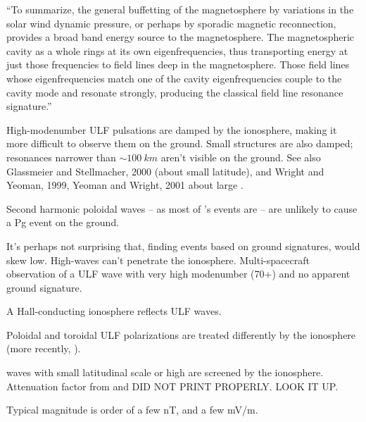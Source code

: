``To summarize, the general buffetting of the magnetosphere by variations in the solar wind dynamic pressure, or perhaps by sporadic magnetic reconnection, provides a broad band energy source to the magnetosphere. The magnetospheric cavity as a whole rings at its own eigenfrequencies, thus transporting energy at just those frequencies to field lines deep in the magnetosphere. Those field lines whose eigenfrequencies match one of the cavity eigenfrequencies couple to the cavity mode and resonate strongly, producing the classical field line resonance signature.\cite{hughes_1994}'' 


High-modenumber ULF pulsations are damped by the ionosphere, making it more difficult to observe them on the ground\cite{hughes_1976}. Small structures are also damped; resonances narrower than $\sim \SI{100}{km}$ aren't visible on the ground. See also Glassmeier and Stellmacher, 2000 (about small latitude), and Wright and Yeoman, 1999, Yeoman and Wright, 2001 about large \azm. 

Second harmonic poloidal waves -- as most of \cite{dai_2015}'s events are -- are unlikely to cause a Pg event on the ground\cite{takahashi_1992}. 

It's perhaps not surprising that, finding events based on ground signatures, \azm would skew low. High-\azm waves can't penetrate the ionosphere. Multi-spacecraft observation of a ULF wave with very high modenumber (70+) and no apparent ground signature\cite{takahashi_2013}. 


A Hall-conducting ionosphere reflects ULF waves\cite{hughes_1974}. 

Poloidal and toroidal ULF polarizations are treated differently by the ionosphere\cite{greifinger_1968} (more recently, \cite{fujita_1988}).  


\Alfven waves with small latitudinal scale\cite{glassmeier_2000} or high \azm\cite{wright_1999,yeoman_2001} are screened by the ionosphere. Attenuation factor from \cite{hughes_1976} and \cite{glassmeier_1984} DID NOT PRINT PROPERLY. LOOK IT UP. 

Typical magnitude is order of a few nT, and a few mV/m\cite{takahashi_2013}. 

